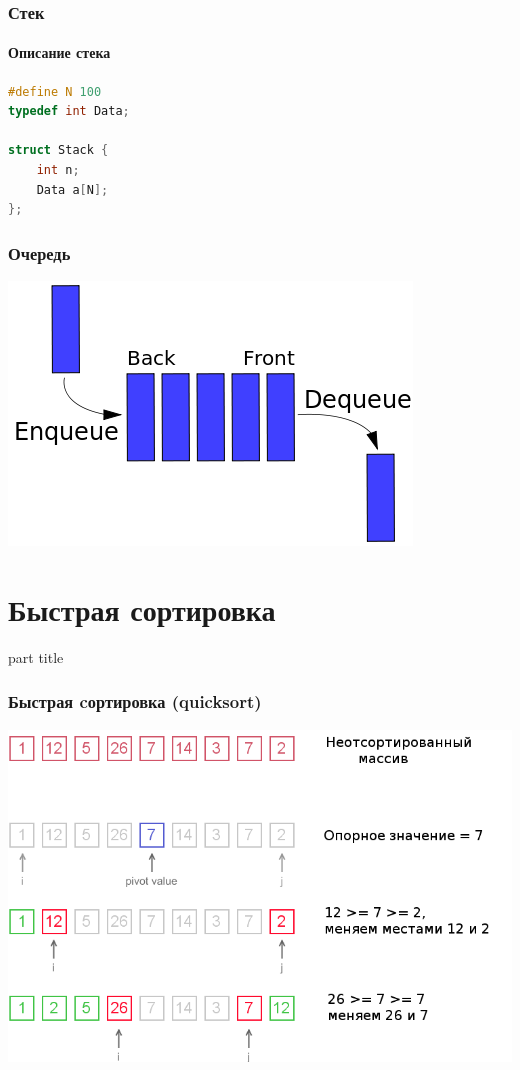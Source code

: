 \documentclass[14pt,pdf,hyperref={unicode}]{beamer}
\begin{document}
\begin{frame}[fragile]
\frametitle{Стек} 
\framesubtitle{Описание стека} 

\begin{lstlisting}[language=C++,basicstyle=\ttfamily,keywordstyle=\color{blue}]
#define N 100
typedef int Data;

struct Stack {
    int n;
    Data a[N];
};
\end{lstlisting}
\end{frame}


\begin{frame}[fragile]
\frametitle{Очередь} 
\begin{center}
\includegraphics[width=0.8\linewidth]{images/queue.png}
\end{center}
\end{frame}




\section{Быстрая сортировка}
\begin{frame}
\begin{center}
\begin{beamercolorbox}[sep=8pt,center]{part
title}
\insertsection
\end{beamercolorbox}
\end{center}
\end{frame}

\begin{frame}[fragile]
\frametitle{Быстрая cортировка (quicksort)} 
\begin{center}
\includegraphics[width=0.9\linewidth]{images/qs1.png}
\end{center}
\end{frame}
\end{document}

